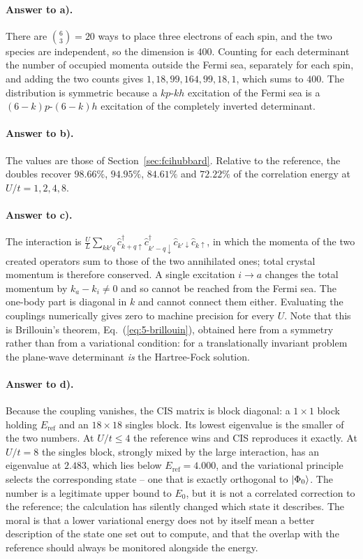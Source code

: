 \paragraph{Answer to a).}
There are $\binom{6}{3}=20$ ways to place three electrons of each spin, and
the two species are independent, so the dimension is $400$.  Counting for each
determinant the number of occupied momenta outside the Fermi sea, separately
for each spin, and adding the two counts gives $1,18,99,164,99,18,1$, which
sums to $400$.  The distribution is symmetric because a $kp$-$kh$ excitation
of the Fermi sea is a $(6-k)p$-$(6-k)h$ excitation of the completely inverted
determinant.

\paragraph{Answer to b).}
The values are those of Section~\ref{sec:fcihubbard}.  Relative to the
reference, the doubles recover $98.66\%$, $94.95\%$, $84.61\%$ and $72.22\%$
of the correlation energy at $U/t=1,2,4,8$.

\paragraph{Answer to c).}
The interaction is
$\tfrac{U}{L}\sum_{kk'q}\hat{c}^{\dagger}_{k+q\uparrow}
\hat{c}^{\dagger}_{k'-q\downarrow}\hat{c}_{k'\downarrow}\hat{c}_{k\uparrow}$,
in which the momenta of the two created operators sum to those of the two
annihilated ones; total crystal momentum is therefore conserved.  A single
excitation $i\to a$ changes the total momentum by $k_a-k_i\ne0$ and so cannot
be reached from the Fermi sea.  The one-body part is diagonal in $k$ and
cannot connect them either.  Evaluating the couplings numerically gives zero
to machine precision for every $U$.  Note that this is Brillouin's theorem,
Eq.~(\ref{eq:5-brillouin}), obtained here from a symmetry rather than from a
variational condition: for a translationally invariant problem the plane-wave
determinant \emph{is} the Hartree-Fock solution.

\paragraph{Answer to d).}
Because the coupling vanishes, the CIS matrix is block diagonal: a $1\times1$
block holding $E_{\mathrm{ref}}$ and an $18\times18$ singles block.  Its
lowest eigenvalue is the smaller of the two numbers.  At $U/t\le4$ the
reference wins and CIS reproduces it exactly.  At $U/t=8$ the singles block,
strongly mixed by the large interaction, has an eigenvalue at $2.483$, which
lies below $E_{\mathrm{ref}}=4.000$, and the variational principle selects the
corresponding state -- one that is exactly orthogonal to $\vert \Phi_0 \rangle$.  The
number is a legitimate upper bound to $E_0$, but it is not a correlated
correction to the reference; the calculation has silently changed which state
it describes.  The moral is that a lower variational energy does not by itself
mean a better description of the state one set out to compute, and that the
overlap with the reference should always be monitored alongside the energy.

